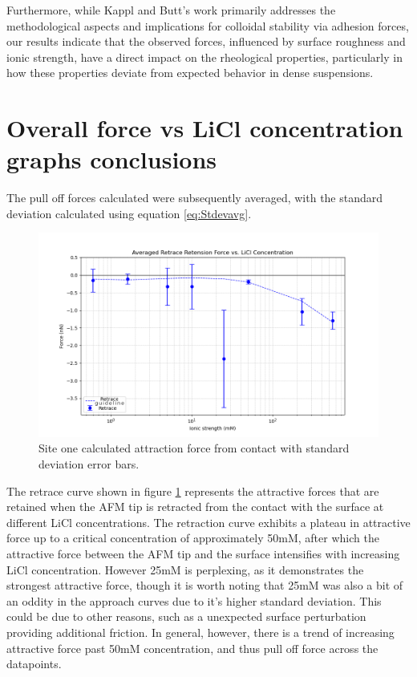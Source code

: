 Furthermore, while Kappl and Butt’s work primarily addresses the methodological aspects and implications for colloidal stability via adhesion forces, our results indicate that the observed forces, influenced by surface roughness and ionic strength, have a direct impact on the rheological properties, particularly in how these properties deviate from expected behavior in dense suspensions. \cite{buttkappl} 

\section{Overall force vs LiCl concentration graphs conclusions}

The pull off forces calculated were subsequently averaged, with the standard deviation calculated using equation \ref{eq:Stdevavg}.

\begin{figure}
    \centering
    \includegraphics[width=1\linewidth]{chapter6/Averages.png}
    \caption{Site one calculated attraction force from contact with standard deviation error bars.}
    \label{fig:site1cont}
\end{figure}


The retrace curve shown in figure \ref{fig:site1cont} represents the attractive forces that are retained when the AFM tip is retracted from the contact with the surface at different LiCl concentrations. The retraction curve exhibits a plateau in attractive force up to a critical concentration of approximately 50mM, after which the attractive force between the AFM tip and the surface intensifies with increasing LiCl concentration. However 25mM is perplexing, as it demonstrates the strongest attractive force, though it is worth noting that 25mM was also a bit of an oddity in the approach curves due to it's higher standard deviation. This could be due to other reasons, such as a unexpected surface perturbation providing additional friction. In general, however, there is a trend of increasing attractive force past 50mM concentration, and thus pull off force across the datapoints.

